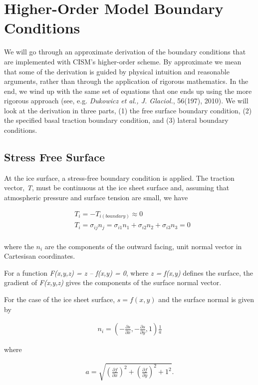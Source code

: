 
\section{Higher-Order Model Boundary Conditions}

We will go through an approximate derivation of the boundary conditions that are implemented with CISM's higher-order scheme. By approximate we mean that some of the derivation is guided by physical intuition and reasonable arguments, rather than through the application of rigorous mathematics. In the end, we wind up with the same set of equations that one ends up using the more rigorous approach (see, e.g. \textit{Dukowicz et al., J. Glaciol.}, 56(197), 2010). We will look at the derivation in three parts, (1) the free surface boundary condition, (2) the specified basal traction boundary condition, and (3) lateral boundary conditions.

\subsection{Stress Free Surface}
At the ice surface, a stress-free boundary condition is applied. The traction vector, \textit{{\large T}}, must be continuous at the ice sheet surface and, assuming that atmospheric pressure and surface tension are small, we have

\begin{align*}
 & T_{i}=-T_{i(boundary)}\approx 0 \\ 
 & T_{i}=\sigma _{ij}n_{j}=\sigma _{i1}n_{1}+\sigma _{i2}n_{2}+\sigma _{i3}n_{3}=0\\
\end{align*}

where the $n_i$ are the components of the outward facing, unit normal vector in Cartesisan coordinates.

For a function \textit{F(x,y,z) = z -- f(x,y) = 0}, where \textit{z = f(x,y)} defines the surface, the gradient of \textit{F(x,y,z)} gives the components of the surface normal vector.

For the case of the ice sheet surface, $s = f(x,y)$ and the surface normal is given by

\begin{align*}
n_{i}=\left( -\frac{\partial s}{\partial x},-\frac{\partial s}{\partial y},1 \right)\frac{1}{a}
\end{align*}

where

\begin{align*}
a=\sqrt{\left( \frac{\partial f}{\partial x} \right)^{2}+\left( \frac{\partial f}{\partial y} \right)^{2}+1^{2}}.
\end{align*}

